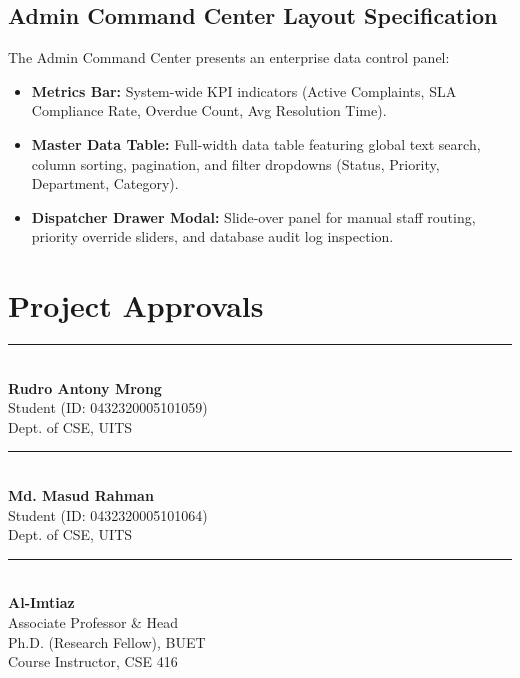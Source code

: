 \documentclass[12pt, a4paper]{article}
\begin{document}
\subsection{Admin Command Center Layout Specification}
The Admin Command Center presents an enterprise data control panel:
\begin{itemize}[leftmargin=*]
    \item \textbf{Metrics Bar:} System-wide KPI indicators (Active Complaints, SLA Compliance Rate, Overdue Count, Avg Resolution Time).
    \item \textbf{Master Data Table:} Full-width data table featuring global text search, column sorting, pagination, and filter dropdowns (Status, Priority, Department, Category).
    \item \textbf{Dispatcher Drawer Modal:} Slide-over panel for manual staff routing, priority override sliders, and database audit log inspection.
\end{itemize}

\clearpage
\section*{Project Approvals}

\vfill 

\noindent
\begin{minipage}{\textwidth}
    \begin{minipage}{0.45\textwidth}
        \rule{\linewidth}{0.4pt}\\[0.2cm]
        \textbf{Rudro Antony Mrong}\\
        Student (ID: 0432320005101059)\\
        Dept. of CSE, UITS
    \end{minipage}
    \hfill
    \begin{minipage}{0.45\textwidth}
        \rule{\linewidth}{0.4pt}\\[0.2cm]
        \textbf{Md. Masud Rahman}\\
        Student (ID: 0432320005101064)\\
        Dept. of CSE, UITS
    \end{minipage}

    \vspace{3.0cm}

    \begin{minipage}{0.6\textwidth}
        \rule{\linewidth}{0.4pt}\\[0.2cm]
        \textbf{Al-Imtiaz}\\
        Associate Professor \& Head\\
        Ph.D. (Research Fellow), BUET\\
        Course Instructor, CSE 416
    \end{minipage}
\end{minipage}
\end{document}
